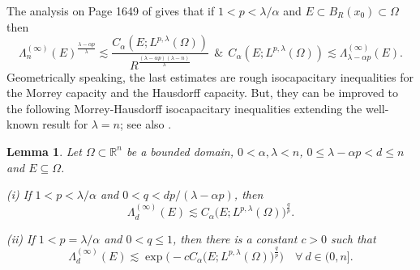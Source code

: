 \documentclass[12pt]{amsart}
\newtheorem{lemma}[theorem]{Lemma}
\begin{document}
The analysis on Page 1649 of \cite{AX2004} gives that if
$1<p<\lambda/\alpha$ and $E\subset B_R(x_0)\subset\Omega$ then
\begin{equation*}\label{e1}
\Lambda_{n}^{(\infty)}(E)^\frac{\lambda-\alpha p}{\lambda}\lesssim
\frac{C_\alpha(E; L^{p,\lambda}(\Omega))}{R^\frac{(\lambda-\alpha p)(\lambda-n)}{\lambda}}\ \ \&\ \ C_\alpha(E; L^{p,\lambda}(\Omega))\lesssim\Lambda_{\lambda-\alpha
p}^{(\infty)}(E).
\end{equation*}
Geometrically speaking, the last estimates are rough isocapacitary inequalities for the Morrey capacity and the Hausdorff capacity. But, they can be improved to the following Morrey-Hausdorff isocapacitary inequalities extending the well-known result for $\lambda=n$; see also \cite{AH1996}.

\begin{lemma}\label{l2} Let $\Omega\subset\mathbb R^n$ be a bounded domain, $0<\alpha,\lambda<n$, $0\le\lambda-\alpha p<d\le n$ and $E\subseteq\Omega$.

\item{\rm(i)} If $1<p<\lambda/\alpha$ and $0<q<dp/(\lambda-\alpha p)$, then
$$
\Lambda_{d}^{(\infty)}(E)\lesssim C_\alpha\big(E;
L^{p,\lambda}(\Omega)\big)^\frac qp.
$$
\item{\rm(ii)} If $1<p=\lambda/\alpha$ and $0<q\le 1$, then there is a constant
$c>0$ such that
$$
\Lambda_{d}^{(\infty)}(E)\lesssim\exp\Big(-c C_\alpha\big(E;
L^{p,\lambda}(\Omega)\big)^\frac qp\Big)\quad\forall\ d\in (0,n].
$$
\end{lemma}
\end{document}

